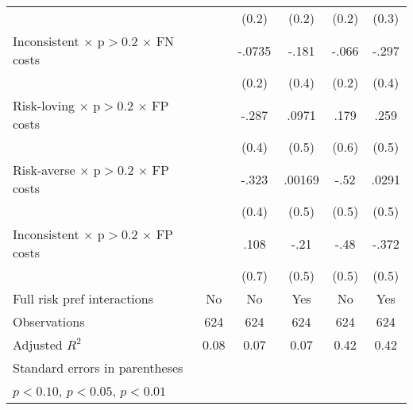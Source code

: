 \begin{table}[htbp]
\begin{tabular}{l*{5}{c}}
                &                  &    (0.2)         &    (0.2)         &    (0.2)         &    (0.3)         \\
Inconsistent $\times$ p$>$0.2 $\times$ FN costs&                  &   -.0735         &    -.181         &    -.066         &    -.297         \\
                &                  &    (0.2)         &    (0.4)         &    (0.2)         &    (0.4)         \\
Risk-loving $\times$ p$>$0.2 $\times$ FP costs&                  &    -.287         &    .0971         &     .179         &     .259         \\
                &                  &    (0.4)         &    (0.5)         &    (0.6)         &    (0.5)         \\
Risk-averse $\times$ p$>$0.2 $\times$ FP costs&                  &    -.323         &   .00169         &     -.52         &    .0291         \\
                &                  &    (0.4)         &    (0.5)         &    (0.5)         &    (0.5)         \\
Inconsistent $\times$ p$>$0.2 $\times$ FP costs&                  &     .108         &     -.21         &     -.48         &    -.372         \\
                &                  &    (0.7)         &    (0.5)         &    (0.5)         &    (0.5)         \\
Full risk pref interactions&       No         &       No         &      Yes         &       No         &      Yes         \\
\hline
Observations    &      624         &      624         &      624         &      624         &      624         \\
Adjusted \(R^{2}\)&     0.08         &     0.07         &     0.07         &     0.42         &     0.42         \\
\hline\hline
\multicolumn{6}{l}{\footnotesize Standard errors in parentheses}\\
\multicolumn{6}{l}{\footnotesize \sym{*} \(p<0.10\), \sym{**} \(p<0.05\), \sym{***} \(p<0.01\)}\\
\end{tabular}
\end{table}
